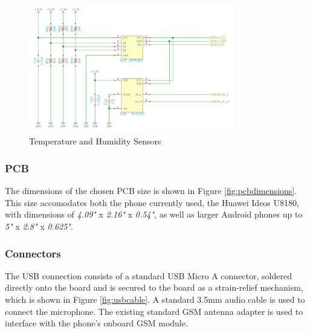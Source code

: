 \documentclass{article}
\numberwithin{figure}{section}
\numberwithin{equation}{section}
\begin{document}
{\begin{figure}[H]
	\centering
	\includegraphics[width=0.8\textwidth]{temphumid}
	\caption{Temperature and Humidity Sensors}
	\label{fig:tandh}
\end{figure}

\subsubsection{PCB} \label{sect:pcbdesign}
The dimensions of the chosen PCB size is shown in Figure \ref{fig:pcbdimensions}. This size accomodates both the phone currently used, the Huawei Ideos U8180, with dimensions of \textit{4.09"} x \textit{2.16"} x \textit{0.54"}, as well as larger Android phones up to \textit{5"} x \textit{2.8"} x \textit{0.625"}.


\subsubsection{Connectors}

The USB connection consists of a standard USB Micro A connector, soldered directly onto the board and is secured to the board as a strain-relief mechanism, which is shown in Figure \ref{fig:usbcable}. A standard 3.5mm audio cable is used to connect the microphone. The existing standard GSM antenna adapter is used to interface with the phone’s onboard GSM module.


}
\end{document}
